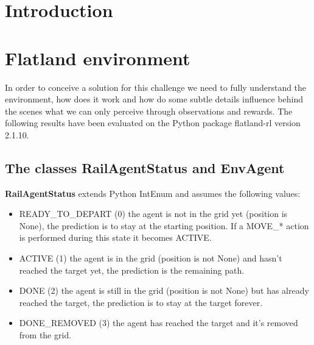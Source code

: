 \documentclass[11pt, a4paper, hidelinks]{report}
\begin{document}
\chapter*{Introduction}

\chapter{Flatland environment}\label{ch:flatland-environment}

In order to conceive a solution for this challenge we need to fully understand the environment, how does it work and how do some subtle details influence behind the scenes what we can only perceive through observations and rewards.
The following results have been evaluated on the Python package flatland-rl version 2.1.10.

\section*{The classes RailAgentStatus and EnvAgent}\label{sec:the-classes-railagentstatus-and-envagent}

\textbf{RailAgentStatus} extends Python IntEnum and assumes the following values:
\begin{itemize}
	\item READY\_TO\_DEPART (0) the agent is not in the grid yet (position is None), the prediction is to stay at the starting position.
If a MOVE\_* action is performed during this state it becomes ACTIVE\@.
	\item ACTIVE (1) the agent is in the grid (position is not None) and hasn't reached the target yet, the prediction is the remaining path.
	\item DONE (2) the agent is still in the grid (position is not None) but has already reached the target, the prediction is to stay at the target forever.
	\item DONE\_REMOVED (3) the agent has reached the target and it's removed from the grid.
\end{itemize}
\end{document}
